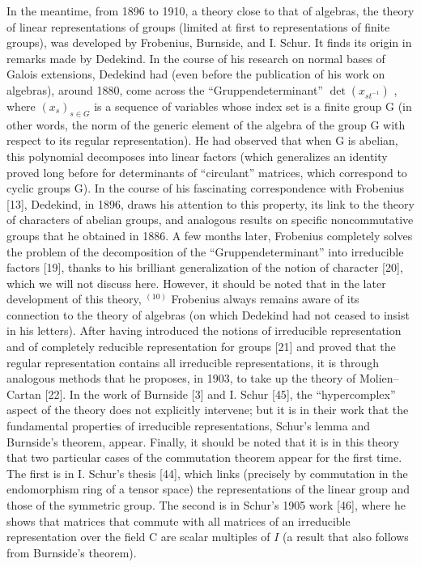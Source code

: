 In the meantime, from 1896 to 1910, a theory close to that of algebras, the theory of linear representations of groups (limited at first to representations of finite groups), was developed by Frobenius, Burnside, and I. Schur. It finds its origin in remarks made by Dedekind. In the course of his research on normal bases of Galois extensions, Dedekind had (even before the publication of his work on algebras), around 1880, come across the ``Gruppendeterminant'' \(\det(x_{st^{-1}})\) , where \((x_{s})_{s\in G}\) is a sequence of variables whose index set is a finite group G (in other words, the norm of the generic element of the algebra of the group G with respect to its regular representation). He had observed that when G is abelian, this polynomial decomposes into linear factors (which generalizes an identity proved long before for determinants of ``circulant'' matrices, which correspond to cyclic groups G). In the course of his fascinating correspondence with Frobenius {[}13{]}, Dedekind, in 1896, draws his attention to this property, its link to the theory of characters of abelian groups, and analogous results on specific noncommutative groups that he obtained in 1886. A few months later, Frobenius completely solves the problem of the decomposition of the ``Gruppendeterminant'' into irreducible factors {[}19{]}, thanks to his brilliant generalization of the notion of character {[}20{]}, which we will not discuss here. However, it should be noted that in the later development of this theory, \(^{(10)}\) Frobenius always remains aware of its connection to the theory of algebras (on which Dedekind had not ceased to insist in his letters). After having introduced the notions of irreducible representation and of completely reducible representation for groups {[}21{]} and proved that the regular representation contains all irreducible representations, it is through analogous methods that he proposes, in 1903, to take up the theory of Molien--Cartan {[}22{]}. In the work of Burnside {[}3{]} and I. Schur {[}45{]}, the ``hypercomplex'' aspect of the theory does not explicitly intervene; but it is in their work that the fundamental properties of irreducible representations, Schur's lemma and Burnside's theorem, appear. Finally, it should be noted that it is in this theory that two particular cases of the commutation theorem appear for the first time. The first is in I. Schur's thesis {[}44{]}, which links (precisely by commutation in the endomorphism ring of a tensor space) the representations of the linear group and those of the symmetric group. The second is in Schur's 1905 work {[}46{]}, where he shows that matrices that commute with all matrices of an irreducible representation over the field C are scalar multiples of \(I\) (a result that also follows from Burnside's theorem).


